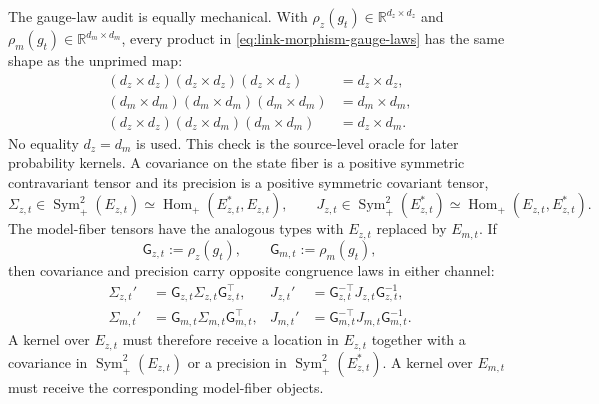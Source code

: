 The gauge-law audit is equally mechanical.  With $\rho_z(g_t)\in\mathbb R^{d_z\times d_z}$ and $\rho_m(g_t)\in\mathbb R^{d_m\times d_m}$, every product in \cref{eq:link-morphism-gauge-laws} has the same shape as the unprimed map:
\begin{equation}
\begin{aligned}
(d_z\times d_z)(d_z\times d_z)(d_z\times d_z)&=d_z\times d_z,\\
(d_m\times d_m)(d_m\times d_m)(d_m\times d_m)&=d_m\times d_m,\\
(d_z\times d_z)(d_z\times d_m)(d_m\times d_m)&=d_z\times d_m.
\end{aligned}
\label{eq:gauge-law-dimension-oracle}
\end{equation}
No equality $d_z=d_m$ is used.  This check is the source-level oracle for later probability kernels.  A covariance on the state fiber is a positive symmetric contravariant tensor and its precision is a positive symmetric covariant tensor,
\begin{equation}
\Sigma_{z,t}\in\operatorname{Sym}^{2}_{+}(E_{z,t})
\simeq\operatorname{Hom}_{+}(E_{z,t}^{*},E_{z,t}),
\qquad
J_{z,t}\in\operatorname{Sym}^{2}_{+}(E_{z,t}^{*})
\simeq\operatorname{Hom}_{+}(E_{z,t},E_{z,t}^{*}).
\label{eq:state-covariance-precision-types}
\end{equation}
The model-fiber tensors have the analogous types with $E_{z,t}$ replaced by $E_{m,t}$.  If
\begin{equation}
\mathsf G_{z,t}:=\rho_z(g_t),
\qquad
\mathsf G_{m,t}:=\rho_m(g_t),
\label{eq:fiber-coordinate-change-matrices}
\end{equation}
then covariance and precision carry opposite congruence laws in either channel:
\begin{equation}
\begin{aligned}
\Sigma_{z,t}'&=\mathsf G_{z,t}\Sigma_{z,t}\mathsf G_{z,t}^{\top},
&J_{z,t}'&=\mathsf G_{z,t}^{-\top}J_{z,t}\mathsf G_{z,t}^{-1},\\
\Sigma_{m,t}'&=\mathsf G_{m,t}\Sigma_{m,t}\mathsf G_{m,t}^{\top},
&J_{m,t}'&=\mathsf G_{m,t}^{-\top}J_{m,t}\mathsf G_{m,t}^{-1}.
\end{aligned}
\label{eq:covariance-precision-opposite-congruence}
\end{equation}
A kernel over $E_{z,t}$ must therefore receive a location in $E_{z,t}$ together with a covariance in $\operatorname{Sym}^{2}_{+}(E_{z,t})$ or a precision in $\operatorname{Sym}^{2}_{+}(E_{z,t}^{*})$.  A kernel over $E_{m,t}$ must receive the corresponding model-fiber objects.

